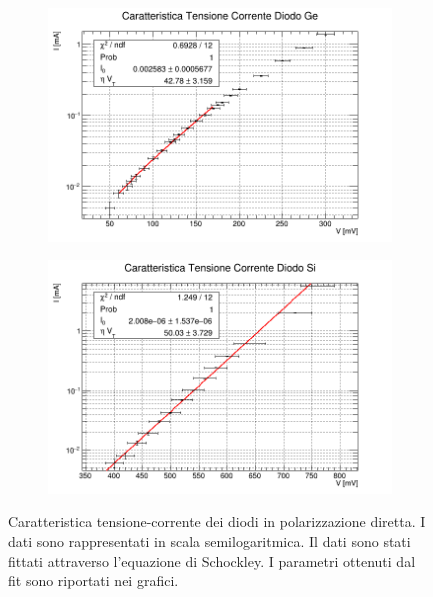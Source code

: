 \documentclass[a4paper,11pt]{article}
\begin{document}
\begin{figure} [h]
  \begin{subfigure}{0.49\textwidth}
    \centering
    \includegraphics[width = \textwidth]{../analisi dati/germanio_fit.png}
  \end{subfigure}
  \begin{subfigure}{0.49\textwidth}
    \centering
    \includegraphics[width = \textwidth]{../analisi dati/silicio_fit.png}
  \end{subfigure}
  \caption{Caratteristica tensione-corrente dei diodi in polarizzazione diretta. I dati sono rappresentati in scala semilogaritmica. Il dati sono stati fittati attraverso l'equazione di Schockley. I parametri ottenuti dal fit sono riportati nei grafici.}
\end{figure}
\end{document}
